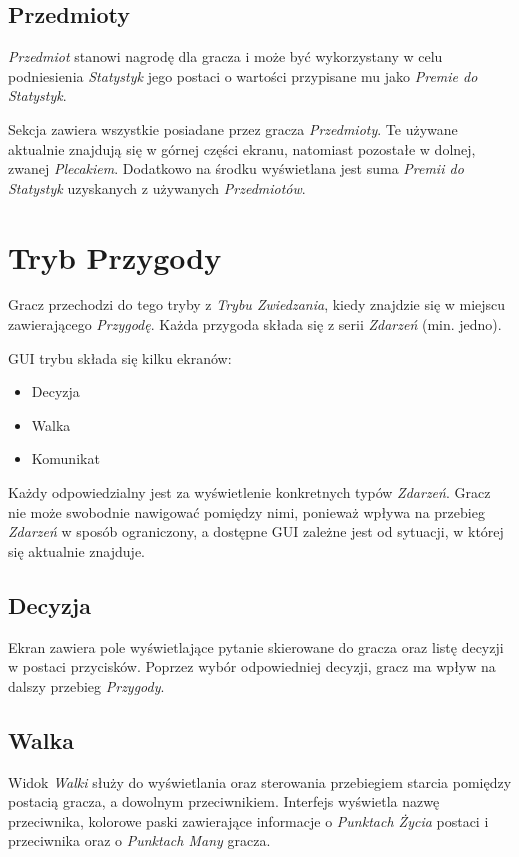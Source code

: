 \documentclass[openright]{xmgr}
\begin{document}
\subsection*{Przedmioty}
\textit{Przedmiot} stanowi nagrodę dla gracza i może być wykorzystany w celu podniesienia \textit{Statystyk} jego postaci o wartości przypisane mu jako \textit{Premie do Statystyk}.

Sekcja zawiera wszystkie posiadane przez gracza \textit{Przedmioty}. Te używane aktualnie znajdują się w górnej części ekranu, natomiast pozostałe w dolnej, zwanej \textit{Plecakiem}. Dodatkowo na środku wyświetlana jest suma \textit{Premii do Statystyk} uzyskanych z używanych \textit{Przedmiotów}.

\section{Tryb Przygody}

Gracz przechodzi do tego tryby z \textit{Trybu Zwiedzania}, kiedy znajdzie się w miejscu zawierającego \textit{Przygodę}. Każda przygoda składa się z serii \textit{Zdarzeń} (min. jedno).

GUI trybu składa się kilku ekranów:
\begin{itemize}
	\item Decyzja
	\item Walka
	\item Komunikat
\end{itemize}

Każdy odpowiedzialny jest za wyświetlenie konkretnych typów \textit{Zdarzeń}. Gracz nie może swobodnie nawigować pomiędzy nimi, ponieważ wpływa na przebieg \textit{Zdarzeń} w sposób ograniczony, a dostępne GUI zależne jest od sytuacji, w której się aktualnie znajduje.
\subsection*{Decyzja}
Ekran zawiera pole wyświetlające pytanie skierowane do gracza oraz listę decyzji w postaci przycisków. Poprzez wybór odpowiedniej decyzji, gracz ma wpływ na dalszy przebieg \textit{Przygody}.
\subsection*{Walka}
Widok \textit{Walki} służy do wyświetlania oraz sterowania przebiegiem starcia pomiędzy postacią gracza, a dowolnym przeciwnikiem. Interfejs wyświetla nazwę przeciwnika, kolorowe paski zawierające informacje o \textit{Punktach Życia} postaci i przeciwnika oraz o \textit{Punktach Many} gracza. 
\end{document}
